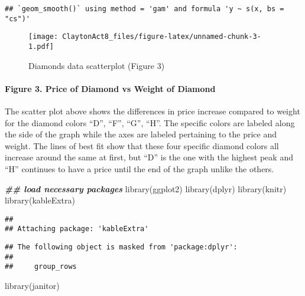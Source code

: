 \documentclass[
]{article}
\newenvironment{Shaded}{\begin{snugshade}}{\end{snugshade}}
\newcommand{\DocumentationTok}[1]{\textcolor[rgb]{0.56,0.35,0.01}{\textbf{\textit{#1}}}}
\newcommand{\FunctionTok}[1]{\textcolor[rgb]{0.00,0.00,0.00}{#1}}
\newcommand{\NormalTok}[1]{#1}
\begin{document}
\begin{verbatim}
## `geom_smooth()` using method = 'gam' and formula 'y ~ s(x, bs = "cs")'
\end{verbatim}

\begin{figure}
\centering
\texttt{[image: ClaytonAct8\_files/figure-latex/unnamed-chunk-3-1.pdf]}
\caption{Diamonds data scatterplot (Figure 3)}
\end{figure}

\hypertarget{figure-3.-price-of-diamond-vs-weight-of-diamond}{%
\paragraph{Figure 3. Price of Diamond vs Weight of
Diamond}\label{figure-3.-price-of-diamond-vs-weight-of-diamond}}

The scatter plot above shows the differences in price increase compared
to weight for the diamond colors ``D'', ``F'', ``G'', ``H''. The
specific colors are labeled along the side of the graph while the axes
are labeled pertaining to the price and weight. The lines of best fit
show that these four specific diamond colors all increase around the
same at first, but ``D'' is the one with the highest peak and ``H''
continues to have a price until the end of the graph unlike the others.

\begin{Shaded}
\begin{Highlighting}[]
\DocumentationTok{\#\# load necessary packages}
\FunctionTok{library}\NormalTok{(ggplot2)}
\FunctionTok{library}\NormalTok{(dplyr)}
\FunctionTok{library}\NormalTok{(knitr)}
\FunctionTok{library}\NormalTok{(kableExtra)}
\end{Highlighting}
\end{Shaded}

\begin{verbatim}
## 
## Attaching package: 'kableExtra'
\end{verbatim}

\begin{verbatim}
## The following object is masked from 'package:dplyr':
## 
##     group_rows
\end{verbatim}

\begin{Shaded}
\begin{Highlighting}[]
\FunctionTok{library}\NormalTok{(janitor)}
\end{Highlighting}
\end{Shaded}
\end{document}

